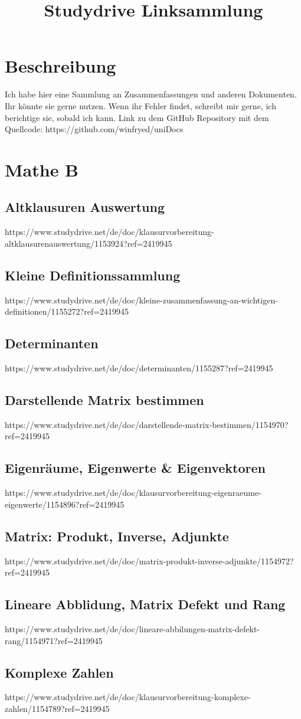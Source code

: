 \documentclass[11pt]{article}
\begin{document}
    \title{Studydrive Linksammlung}
    \section{Beschreibung}
    Ich habe hier eine Sammlung an Zusammenfassungen und anderen Dokumenten.
    Ihr könnte sie gerne nutzen.
    Wenn ihr Fehler findet, schreibt mir gerne, ich berichtige sie, sobald ich kann.\newline
    Link zu dem GitHub Repository mit dem Quellcode: https://github.com/winfryed/uniDocs


    \section{Mathe B}
    \subsection{Altklausuren Auswertung}
    https://www.studydrive.net/de/doc/klausurvorbereitung-altklausurenauswertung/1153924?ref=2419945
    \subsection{Kleine Definitionssammlung}
    https://www.studydrive.net/de/doc/kleine-zusammenfassung-an-wichtigen-definitionen/1155272?ref=2419945
    \subsection{Determinanten}
    https://www.studydrive.net/de/doc/determinanten/1155287?ref=2419945
    \subsection{Darstellende Matrix bestimmen}
    https://www.studydrive.net/de/doc/darstellende-matrix-bestimmen/1154970?ref=2419945
    \subsection{Eigenräume, Eigenwerte & Eigenvektoren}
    https://www.studydrive.net/de/doc/klausurvorbereitung-eigenraeume-eigenwerte/1154896?ref=2419945
    \subsection{Matrix: Produkt, Inverse, Adjunkte}
    https://www.studydrive.net/de/doc/matrix-produkt-inverse-adjunkte/1154972?ref=2419945
    \subsection{Lineare Abblidung, Matrix Defekt und Rang}
    https://www.studydrive.net/de/doc/lineare-abbilungen-matrix-defekt-rang/1154971?ref=2419945
    \subsection{Komplexe Zahlen}
    https://www.studydrive.net/de/doc/klausurvorbereitung-komplexe-zahlen/1154789?ref=2419945
\end{document}
